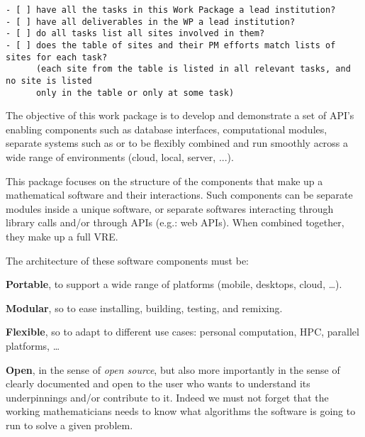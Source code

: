 \begin{draft}
\begin{verbatim}
- [ ] have all the tasks in this Work Package a lead institution?
- [ ] have all deliverables in the WP a lead institution?
- [ ] do all tasks list all sites involved in them?
- [ ] does the table of sites and their PM efforts match lists of sites for each task?
      (each site from the table is listed in all relevant tasks, and no site is listed
      only in the table or only at some task)
\end{verbatim}
\end{draft}

\begin{workpackage}[id=component-architecture,wphases=0-48!.5,
  title=Component Architecture,lead=UV,
  PSRM=64,UVRM=8,SARM=16, USHRM=4, USORM=6, UBRM=12]

  \begin{wpobjectives}
    The objective of this work package is to develop and demonstrate a
    set of API's enabling components such as database interfaces,
    computational modules, separate systems such as \GAP or \Sage to
    be flexibly combined and run smoothly across a wide range of
    environments (cloud, local, server, ...).
  \end{wpobjectives}

  \begin{wpdescription}
    This package focuses on the structure of the components that make
    up a mathematical software and their interactions. Such components
    can be separate modules inside a unique software, or separate
    softwares interacting through library calls and/or through APIs
    (e.g.: web APIs). When combined together, they make up a full VRE.

    The architecture of these software components must be:
    \begin{compactitem}
    \item \textbf{Portable}, to support a wide range of platforms
      (mobile, desktops, cloud, \dots).
    \item \textbf{Modular}, so to ease installing, building, testing,
      and remixing.
    \item \textbf{Flexible}, so to adapt to different use cases:
      personal computation, HPC, parallel platforms, \dots
    \item \textbf{Open}, in the sense of \emph{open source}, but also
      more importantly in the sense of clearly documented and open to
      the user who wants to understand its underpinnings and/or
      contribute to it. Indeed we must not forget that the working
      mathematicians needs to know what algorithms the software is
      going to run to solve a given problem.
    \end{compactitem}
  \end{wpdescription}


\end{workpackage}

